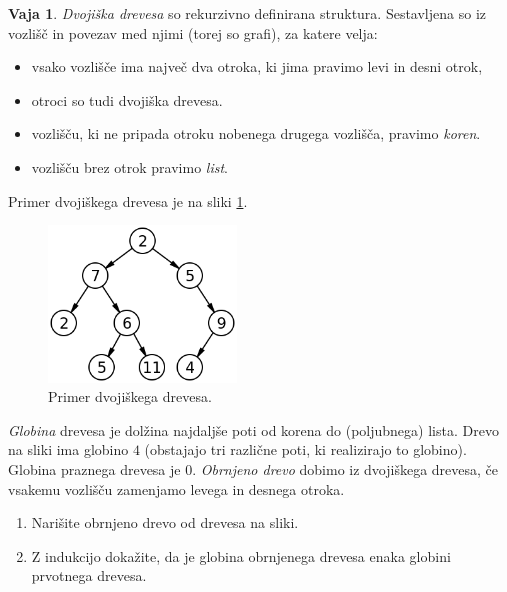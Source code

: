 \documentclass{article}
\theoremstyle{definition}
\newtheorem{vaja}{Vaja}
\begin{document}
\begin{vaja}
	\emph{Dvojiška drevesa} so rekurzivno definirana struktura. Sestavljena so iz vozlišč in povezav med njimi (torej so grafi), za katere velja:
	\begin{itemize}
		\item vsako vozlišče ima največ dva otroka, ki jima pravimo levi in desni otrok,
		\item otroci so tudi dvojiška drevesa. 
		\item vozlišču, ki ne pripada otroku nobenega drugega vozlišča, pravimo \emph{koren}.
		\item vozlišču brez otrok pravimo \emph{list}.
	\end{itemize}
	Primer dvojiškega drevesa je na sliki \ref{fig:drevo}.
	\begin{figure}[!h]
		\centering
		\includegraphics[width = 5cm]{Binary_tree.png}
		\caption{Primer dvojiškega drevesa.}
		\label{fig:drevo}
	\end{figure}
	
	\emph{Globina} drevesa je dolžina najdaljše poti od korena do (poljubnega) lista. Drevo na sliki ima globino $4$ (obstajajo tri različne poti, ki realizirajo to globino). Globina praznega drevesa je 0.  
	\emph{Obrnjeno drevo} dobimo iz dvojiškega drevesa, če vsakemu vozlišču zamenjamo levega in desnega otroka. 
	\begin{enumerate}
		\item Narišite obrnjeno drevo od drevesa na sliki.
		\item Z indukcijo dokažite, da je globina obrnjenega drevesa enaka globini prvotnega drevesa. 
	\end{enumerate}
\end{vaja}
\end{document}

